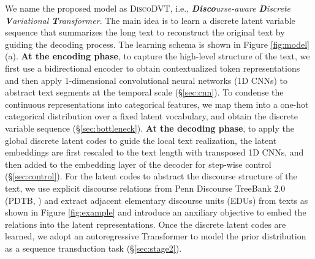 \documentclass[11pt]{article}
\begin{document}
We name the proposed model as \textsc{DiscoDVT}, i.e., \textit{\textbf{Disco}urse-aware \textbf{D}iscrete \textbf{V}ariational \textbf{T}ransformer}. The main idea is to learn a discrete latent variable sequence that summarizes the long text to reconstruct the original text by guiding the decoding process. The learning schema is shown in Figure \ref{fig:model} (a). \textbf{At the encoding phase}, to capture the high-level structure of the text, we first use a bidirectional encoder to obtain contextualized token representations and then apply 1-dimensional convolutional neural networks (1D CNNs) to abstract text segments at the temporal scale (\S{\ref{sec:cnn}}). To condense the continuous representations into categorical features, we map them into a one-hot categorical distribution over a fixed latent vocabulary, and obtain the discrete variable sequence (\S{\ref{sec:bottleneck}}). \textbf{At the decoding phase}, to apply the global discrete latent codes to guide the local text realization, the latent embeddings are first rescaled to the text length with transposed 1D CNNs, and then added to the embedding layer of the decoder for step-wise control (\S{\ref{sec:control}}). For the latent codes to abstract the discourse structure of the text, we use explicit discourse relations from Penn Discourse TreeBank 2.0 (PDTB, \citealp{pdtb2}) and extract adjacent elementary discourse units (EDUs) from texts as shown in Figure \ref{fig:example} and introduce an anxiliary objective to embed the relations into the latent representations.
Once the discrete latent codes are learned, we adopt an autoregressive Transformer to model the prior distribution as a sequence transduction task (\S{\ref{sec:stage2}}). 
\end{document}

